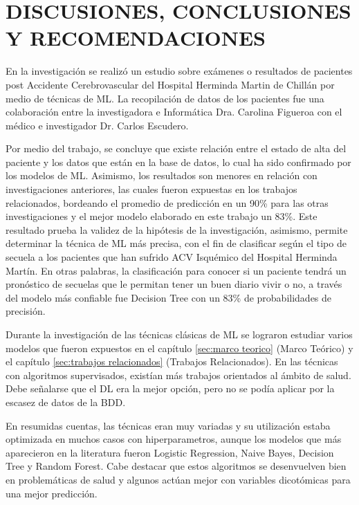 \doublespacing
\chapter{DISCUSIONES, CONCLUSIONES Y RECOMENDACIONES}

\par En la investigación se realizó un estudio sobre exámenes o resultados de pacientes post Accidente Cerebrovascular del Hospital Herminda Martin de Chillán por medio de técnicas de ML. La recopilación de datos de los pacientes fue una colaboración entre la investigadora e Informática Dra. Carolina Figueroa con el médico e investigador Dr. Carlos Escudero.\\

\par Por medio del trabajo, se concluye que existe relación entre el estado de alta del paciente y los datos que están en la base de datos, lo cual ha sido confirmado por los modelos de ML. Asimismo, los resultados son menores en relación con investigaciones anteriores, las cuales fueron expuestas en los trabajos relacionados, bordeando el promedio de predicción en un 90\% para las otras investigaciones y el mejor modelo elaborado en este trabajo un 83\%. Este resultado prueba la validez de la hipótesis de la investigación, asimismo, permite determinar la técnica de ML más precisa, con el fin de clasificar según el tipo de secuela a los pacientes que han sufrido ACV Isquémico del Hospital Herminda Martín. En otras palabras, la clasificación para conocer si un paciente tendrá un pronóstico de secuelas que le permitan tener un buen diario vivir o no, a través del modelo más confiable fue Decision Tree con un 83\% de probabilidades de precisión.\\

\par Durante la investigación de las técnicas clásicas de ML se lograron estudiar varios modelos que fueron expuestos en el  capítulo \ref{sec:marco teorico} (Marco Teórico) y el capítulo \ref{sec:trabajos relacionados} (Trabajos Relacionados). En las técnicas con algoritmos supervisados, existían más trabajos orientados al ámbito de salud. Debe señalarse que el DL era la mejor opción, pero no se podía aplicar por la escasez de datos de la BDD.\\

\par En resumidas cuentas, las técnicas eran muy variadas y su utilización estaba optimizada en muchos casos con hiperparametros, aunque los modelos que más aparecieron en la literatura fueron Logistic Regression, Naive Bayes, Decision Tree y Random Forest. Cabe destacar que estos algoritmos se desenvuelven bien en problemáticas de salud y algunos actúan mejor con variables dicotómicas para una mejor predicción.\\

